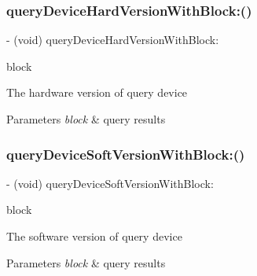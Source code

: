 \subsubsection{\texorpdfstring{query\+Device\+Hard\+Version\+With\+Block\+:()}{queryDeviceHardVersionWithBlock:()}}
{\footnotesize\ttfamily -\/ (void) query\+Device\+Hard\+Version\+With\+Block\+: \begin{DoxyParamCaption}\item[{(P\+V\+S\+D\+K\+Query\+Device\+Version\+Block)}]{block }\end{DoxyParamCaption}}

The hardware version of query device


\begin{DoxyParams}{Parameters}
{\em block} & query results \\
\hline
\end{DoxyParams}
\mbox{\label{interface_p_v_mount_controller_ab0c44814e085926888a9bf3d592bc7f1}} 
\subsubsection{\texorpdfstring{query\+Device\+Soft\+Version\+With\+Block\+:()}{queryDeviceSoftVersionWithBlock:()}}
{\footnotesize\ttfamily -\/ (void) query\+Device\+Soft\+Version\+With\+Block\+: \begin{DoxyParamCaption}\item[{(P\+V\+S\+D\+K\+Query\+Device\+Version\+Block)}]{block }\end{DoxyParamCaption}}

The software version of query device


\begin{DoxyParams}{Parameters}
{\em block} & query results \\
\hline
\end{DoxyParams}
\mbox{\label{interface_p_v_mount_controller_a08d38f3bfb4a776cf1d9789023cc72e2}} 
